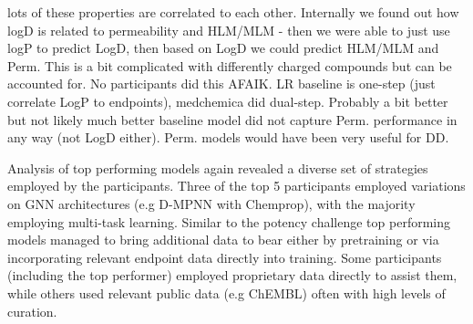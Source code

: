 \documentclass[journal=jcim,manuscript=article]{achemso}
\begin{document}
lots of these properties are correlated to each other. Internally we found out how logD is related to permeability and HLM/MLM - then we were able to just use logP to predict LogD, then based on LogD we could predict HLM/MLM and Perm. This is a bit complicated with differently charged compounds but can be accounted for. No participants did this AFAIK. LR baseline is one-step (just correlate LogP to endpoints), medchemica did dual-step. Probably a bit better but not likely much better
baseline model did not capture Perm. performance in any way (not LogD either). Perm. models would have been very useful for DD.



Analysis of top performing models again revealed a diverse set of strategies employed by the participants. Three of the top 5 participants employed variations on GNN architectures (e.g D-MPNN with Chemprop), with the majority employing multi-task learning. Similar to the potency challenge top performing models managed to bring additional data to bear either by pretraining or via incorporating relevant endpoint data directly into training. Some participants (including the top performer) employed proprietary data directly to assist them, while others used relevant public data (e.g ChEMBL) often with high levels of curation.
\end{document}
